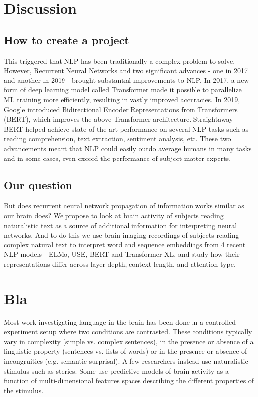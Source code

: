 \documentclass{article}
\begin{document}
    \section{Discussion}\label{sec:discussion}












  \subsection{How to create a project}
This triggered that NLP has been traditionally a complex problem to solve\cite{jones1992natural}. However, Recurrent Neural Networks and two significant advances - one in 2017 and another in 2019 - brought substantial improvements to NLP. In 2017, a new form of deep learning model called Transformer\cite{wang2019r} made it possible to parallelize ML training more efficiently, resulting in vastly improved accuracies.
In 2019, Google introduced Bidirectional Encoder Representations from Transformers (BERT)\cite{kamath2022bidirectional}, which improves the above Transformer architecture. Straightaway BERT helped achieve state-of-the-art performance\cite{DBLP:journals/corr/abs-1810-04805} on several NLP tasks such as reading comprehension, text extraction, sentiment analysis, etc. These two advancements meant that NLP could easily outdo average humans in many tasks and in some cases, even exceed the performance of subject matter experts. 
\subsection{Our question}
But does recurrent neural network propagation of information works similar as our brain does? We propose to look at brain activity of subjects reading naturalistic text as a source of additional information for interpreting neural networks. And to do this we use brain imaging recordings of subjects reading complex natural text to interpret word and sequence embeddings from 4 recent NLP models - ELMo, USE, BERT and Transformer-XL, and study how their representations differ across layer depth, context length, and attention type.

\section{Bla}
\label{sec:bla}

Most work investigating language in the brain has been done in a controlled experiment setup where two conditions are contrasted\cite{friederici2011brain}. These conditions typically vary in complexity (simple vs. complex sentences), in the presence or absence of a linguistic property (sentences vs. lists of words) or in the presence or absence of incongruities (e.g. semantic surprisal)\cite{friederici2011brain}. A few researchers instead use naturalistic stimulus such as stories\cite{brennan2012syntactic}. Some use predictive models of brain activity as a function of multi-dimensional features spaces describing the different properties of the stimulus\cite{wehbe2014simultaneously}.
\end{document}
